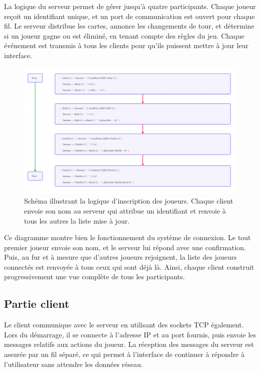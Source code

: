 \documentclass{article}
\begin{document}
La logique du serveur permet de gérer jusqu'à quatre participants. Chaque joueur reçoit un identifiant unique, et un port de communication est ouvert pour chaque fil. Le serveur distribue les cartes, annonce les changements de tour, et détermine si un joueur gagne ou est éliminé, en tenant compte des règles du jeu. Chaque événement est transmis à tous les clients pour qu'ils puissent mettre à jour leur interface.

\begin{figure}[H]
    \centering
    \includegraphics[width=0.95\linewidth]{images/Logique_de_connexion_des utilisateurs.PNG}
    \caption{Schéma illustrant la logique d'inscription des joueurs. Chaque client envoie son nom au serveur qui attribue un identifiant et renvoie à tous les autres la liste mise à jour.}
\end{figure}
    
Ce diagramme montre bien le fonctionnement du système de connexion. 
Le tout premier joueur envoie son nom, et le serveur lui répond avec une confirmation. 
Puis, au fur et à mesure que d'autres joueurs rejoignent, la liste des joueurs connectés est renvoyée à tous ceux qui sont déjà là. 
Ainsi, chaque client construit progressivement une vue complète de tous les participants.


\subsection{Partie client}

Le client communique avec le serveur en utilisant des sockets TCP également. Lors du démarrage, il se connecte à l'adresse IP et au port fournis, puis envoie les messages relatifs aux actions du joueur. La réception des messages du serveur est assurée par un fil séparé, ce qui permet à l'interface de continuer à répondre à l'utilisateur sans attendre les données réseau.
\end{document}
